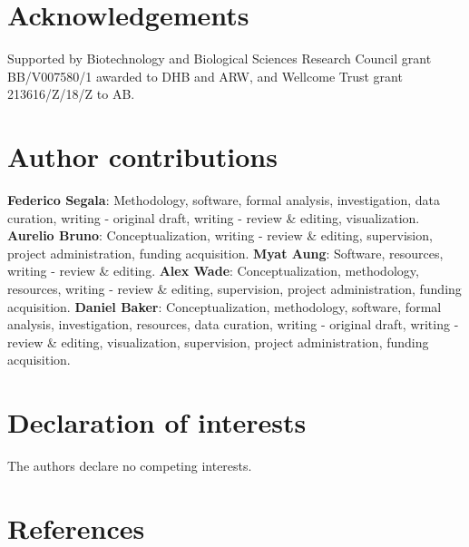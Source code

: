 \documentclass[
]{article}
\begin{document}
\hypertarget{acknowledgements}{%
\section{Acknowledgements}\label{acknowledgements}}

Supported by Biotechnology and Biological Sciences Research Council grant BB/V007580/1 awarded to DHB and ARW, and Wellcome Trust grant 213616/Z/18/Z to AB.

\hypertarget{author-contributions}{%
\section{Author contributions}\label{author-contributions}}

\textbf{Federico Segala}: Methodology, software, formal analysis, investigation, data curation, writing - original draft, writing - review \& editing, visualization. \textbf{Aurelio Bruno}: Conceptualization, writing - review \& editing, supervision, project administration, funding acquisition. \textbf{Myat Aung}: Software, resources, writing - review \& editing. \textbf{Alex Wade}: Conceptualization, methodology, resources, writing - review \& editing, supervision, project administration, funding acquisition. \textbf{Daniel Baker}: Conceptualization, methodology, software, formal analysis, investigation, resources, data curation, writing - original draft, writing - review \& editing, visualization, supervision, project administration, funding acquisition.

\hypertarget{declaration-of-interests}{%
\section{Declaration of interests}\label{declaration-of-interests}}

The authors declare no competing interests.

\hypertarget{references}{%
\section{References}\label{references}}
\end{document}
